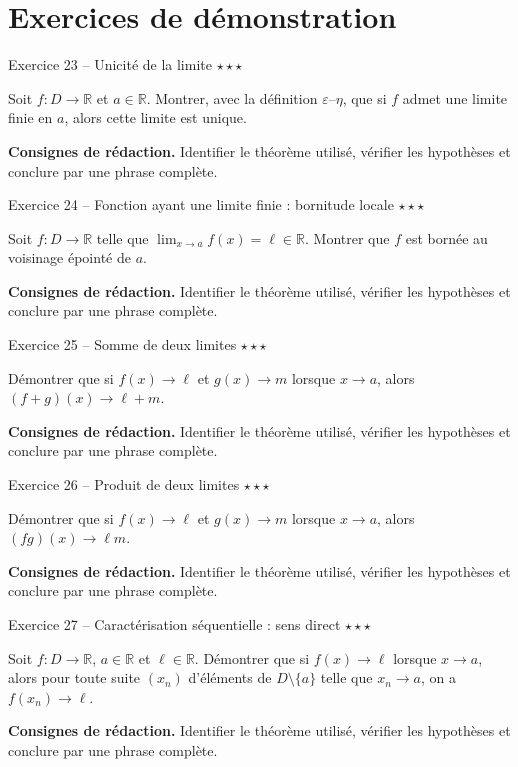\documentclass[11pt,a4paper]{article}
\newcommand{\etoiles}[1]{\hfill\textcolor{orangeprepa}{\textbf{#1}}}
\newcommand{\R}{\mathbb{R}}
\begin{document}
\section{Exercices de démonstration}
\begin{exobox}{Exercice 23 -- Unicité de la limite \etoiles{$\star\star\star$}}

Soit $f:D\to\R$ et $a\in\R$. Montrer, avec la définition $\varepsilon$--$\eta$, que si $f$ admet une limite finie en $a$, alors cette limite est unique.

\medskip
\textbf{Consignes de rédaction.} Identifier le théorème utilisé, vérifier les hypothèses et conclure par une phrase complète.
\end{exobox}


\begin{exobox}{Exercice 24 -- Fonction ayant une limite finie : bornitude locale \etoiles{$\star\star\star$}}

Soit $f:D\to\R$ telle que $\lim_{x\to a}f(x)=\ell\in\R$. Montrer que $f$ est bornée au voisinage épointé de $a$.

\medskip
\textbf{Consignes de rédaction.} Identifier le théorème utilisé, vérifier les hypothèses et conclure par une phrase complète.
\end{exobox}


\begin{exobox}{Exercice 25 -- Somme de deux limites \etoiles{$\star\star\star$}}

Démontrer que si $f(x)\to\ell$ et $g(x)\to m$ lorsque $x\to a$, alors $(f+g)(x)\to\ell+m$.

\medskip
\textbf{Consignes de rédaction.} Identifier le théorème utilisé, vérifier les hypothèses et conclure par une phrase complète.
\end{exobox}


\begin{exobox}{Exercice 26 -- Produit de deux limites \etoiles{$\star\star\star$}}

Démontrer que si $f(x)\to\ell$ et $g(x)\to m$ lorsque $x\to a$, alors $(fg)(x)\to\ell m$.

\medskip
\textbf{Consignes de rédaction.} Identifier le théorème utilisé, vérifier les hypothèses et conclure par une phrase complète.
\end{exobox}


\begin{exobox}{Exercice 27 -- Caractérisation séquentielle : sens direct \etoiles{$\star\star\star$}}

Soit $f:D\to\R$, $a\in\R$ et $\ell\in\R$. Démontrer que si $f(x)\to\ell$ lorsque $x\to a$, alors pour toute suite $(x_n)$ d'éléments de $D\setminus\{a\}$ telle que $x_n\to a$, on a $f(x_n)\to\ell$.

\medskip
\textbf{Consignes de rédaction.} Identifier le théorème utilisé, vérifier les hypothèses et conclure par une phrase complète.
\end{exobox}
\end{document}

